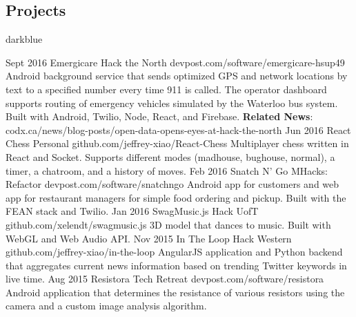 \documentclass{resume}
\begin{document}
\begin{main}
		\section{Projects}{darkblue}
			\begin{entrylist}
				\rightentry%
					{Sept 2016}%
					{Emergicare}%
					{Hack the North}%
					{devpost.com/software/emergicare-hsup49}%
					{Android background service that sends optimized GPS and network locations by text to a specified number every time 911 is called. The operator dashboard supports routing of emergency vehicles simulated by the Waterloo bus system. Built with Android, Twilio, Node, React, and Firebase. \textbf{Related News}: \color{darkblue}codx.ca/news/blog-posts/open-data-opens-eyes-at-hack-the-north}
				\rightentry%
					{Jun 2016}%
					{React Chess}%
					{Personal}%
					{github.com/jeffrey-xiao/React-Chess}%
					{Multiplayer chess written in React and Socket. Supports different modes (madhouse, bughouse, normal), a timer, a chatroom, and a history of moves.}
				\rightentry%
					{Feb 2016}%
					{Snatch N' Go}%
					{MHacks: Refactor}%
					{devpost.com/software/snatchngo}%
					{Android app for customers and web app for restaurant managers for simple food ordering and pickup. Built with the FEAN stack and Twilio.}
				\rightentry%
					{Jan 2016}%
					{SwagMusic.js}%
					{Hack UofT}%
					{github.com/xelendt/swagmusic.js}%
					{3D model that dances to music. Built with WebGL and Web Audio API.}
				\rightentry%
					{Nov 2015}%
					{In The Loop}%
					{Hack Western}%
					{github.com/jeffrey-xiao/in-the-loop}%
					{AngularJS application and Python backend that aggregates current news information based on trending Twitter keywords in live time.}
				\rightentry%
					{Aug 2015}%
					{Resistora}%
					{Tech Retreat}%
					{devpost.com/software/resistora}%
					{Android application that determines the resistance of various resistors using the camera and a custom image analysis algorithm.}
			\end{entrylist}	
	\end{main}
\end{document}
